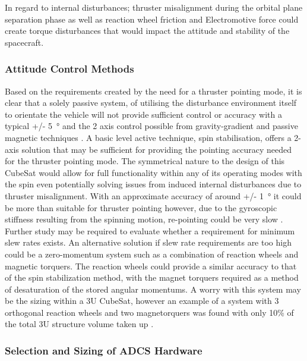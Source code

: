 In regard to internal disturbances; thruster misalignment during the orbital plane separation phase as well as reaction wheel friction and Electromotive force could create torque disturbances that would impact the attitude and stability of the spacecraft.

\subsubsection{Attitude Control Methods}

Based on the requirements created by the need for a thruster pointing mode, it
is clear that a solely passive system, of utilising the disturbance environment
itself to orientate the vehicle will not provide sufficient control or accuracy
with a typical +/- \SI{5}{\degree} and the 2 axis control possible from
gravity-gradient and passive magnetic techniques \cite{ADCS_nasa}.
A basic level active technique, spin stabilisation, offers a 2-axis solution that
may be sufficient for providing the pointing accuracy needed for the thruster
pointing mode. The symmetrical nature to the design of this CubeSat would allow
for full functionality within any of its operating modes with the spin even
potentially solving issues from induced internal disturbances due to thruster
misalignment. With an approximate accuracy of around +/- \SI{1}{\degree} it could
be more than suitable for thruster pointing however, due to the gyroscopic stiffness
resulting from the spinning motion, re-pointing could be very slow \cite{ADCS_nasa}.
Further study may be required to evaluate whether a requirement for minimum slew rates exists.
An alternative solution if slew rate requirements are too high could be a zero-momentum
system such as a combination of reaction wheels and magnetic torquers.
The reaction wheels could provide a similar accuracy to that of the spin
stabilization method, with the magnet torquers required as a method of desaturation
of the stored angular momentums. A worry with this system may be the sizing within
a 3U CubeSat, however an example of a system with 3 orthogonal reaction wheels and
two magnetorquers was found with only 10\% of the total 3U structure volume taken
up \cite{Delfi-n3xt}.

\subsubsection{Selection and Sizing of ADCS Hardware}

